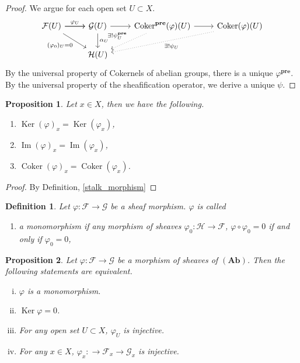 \documentclass{article}
\newtheorem{proposition}{Proposition}[section]
\newtheorem{definition}{Definition}[section]
\numberwithin{equation}{section}
\DeclareMathOperator{\Ker}{Ker}
\DeclareMathOperator{\Image}{Im}
\DeclareMathOperator{\Coker}{Coker}
\begin{document}
\begin{proof}
We argue for each open set $U\subset X$. 
\[
\begin{tikzcd}
\mathcal{F}(U) \arrow[r, "\varphi_U"] \arrow[r] \arrow[rd, "(\varphi_0)_U=0"'] & \mathcal{G}(U) \arrow[r] \arrow[d,"\alpha_U"] & \Coker^{\mathbf{pre}}(\varphi)(U) \arrow[ld, "\exists!\psi^{\mathbf{pre}}_U"', dotted] \arrow[r]& \Coker(\varphi)(U) \arrow[lld, "\exists!\psi_U", dotted] \\
                                                                    & \mathcal{H}(U)                     &                                                                                   &                                                    
\end{tikzcd}
\]
By the universal property of Cokernels of abelian groups, there is a unique $\varphi^{\mathbf{pre}}$. By the universal property of the sheafification operator, we derive a unique $\psi$.
\end{proof}

\begin{proposition}
Let $x\in X$, then we have the following.
\begin{enumerate}[1).]
\item $\Ker(\varphi)_x=\Ker(\varphi_x)$,
\item $\Image(\varphi)_x=\Image(\varphi_x)$,
\item $\Coker(\varphi)_x=\Coker(\varphi_x)$.
\end{enumerate}
\end{proposition}

\begin{proof}
By Definition, \ref{stalk_morphism}
\end{proof}

\begin{definition}
Let $\varphi:\mathcal{F}\to\mathcal{G}$ be a sheaf morphism. $\varphi$ is called
\begin{enumerate}[1).]
\item a monomorphism if any morphism of sheaves $\varphi_0:\mathcal{H}\to\mathcal{F}$, $\varphi\circ\varphi_0=0$ if and only if $\varphi_0=0$,
\end{enumerate}
\end{definition}

\begin{proposition}
Let $\varphi:\mathcal{F}\to\mathcal{G}$ be a morphism of sheaves of $(\mathbf{Ab})$. Then the following statements are equivalent.
\begin{enumerate}[i).]
\item $\varphi$ is a monomorphism.
\item $\Ker\varphi = 0$.
\item For any open set $U\subset X$, $\varphi_U$ is injective.
\item For any $x\in X$, $\varphi_x:\to\mathcal{F}_x\to\mathcal{G}_x$ is injective.
\end{enumerate}
\end{proposition}
\end{document}
